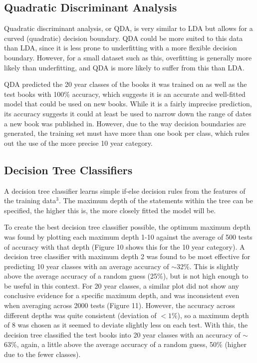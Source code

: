 \documentclass[11pt,a4paper,reqno]{amsart}
\begin{document}
\subsection{Quadratic Discriminant Analysis}
Quadratic discriminant analysis, or QDA, is very similar to LDA but allows for a curved (quadratic) decision boundary. QDA could be more suited to this data than LDA, since it is less prone to underfitting with a more flexible decision boundary. However, for a small dataset such as this, overfitting is generally more likely than underfitting, and QDA is more likely to suffer from this than LDA. 

QDA predicted the 20 year classes of the books it was trained on as well as the test books with 100\% accuracy, which suggests it is an accurate and well-fitted model that could be used on new books. While it is a fairly imprecise prediction, its accuracy suggests it could at least be used to narrow down the range of dates a new book was published in. However, due to the way decision boundaries are generated, the training set must have more than one book per class, which rules out the use of the more precise 10 year category.

\subsection{Decision Tree Classifiers}
A decision tree classifier learns simple if-else decision rules from the features of the training data$^3$. The maximum depth of the statements within the tree can be specified, the higher this is, the more closely fitted the model will be. 

To create the best decision tree classifier possible, the optimum maximum depth was found by plotting each maximum depth 1-10 against the average of 500 tests of accuracy with that depth (Figure 10 shows this for the 10 year category). A decision tree classifier with maximum depth 2 was found to be most effective for predicting 10 year classes with an average accuracy of $\sim$32\%. This is slightly above the average accuracy of a random guess (25\%), but is not high enough to be useful in this context. For 20 year classes, a similar plot did not show any conclusive evidence for a specific maximum depth, and was inconsistent even when averaging across 2000 tests (Figure 11). However, the accuracy across different depths was quite consistent (deviation of $ <1\% $), so a maximum depth of 8 was chosen as it seemed to deviate slightly less on each test. With this, the decision tree classified the test books into 20 year classes with an accuracy of $\sim$63\%, again, a little above the average accuracy of a random guess, 50\% (higher due to the fewer classes). 
\end{document}
